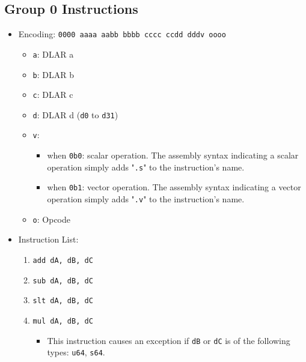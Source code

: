 \documentclass{article}
\begin{document}
	\subsection{Group 0 Instructions}
		\begin{itemize}
		\item Encoding: \texttt{0000 aaaa aabb bbbb  cccc ccdd dddv oooo}
			\begin{itemize}
			\item \texttt{a}: DLAR a
			\item \texttt{b}: DLAR b
			\item \texttt{c}: DLAR c
			\item \texttt{d}: DLAR d (\texttt{d0} to \texttt{d31})
			\item \texttt{v}:
				\begin{itemize}
				\item when \texttt{0b0}: scalar operation. The assembly
					syntax indicating a scalar operation simply adds
					"\texttt{.s}" to the instruction's name.
				\item when \texttt{0b1}: vector operation. The assembly
					syntax indicating a vector operation simply adds
					"\texttt{.v}" to the instruction's name.
				\end{itemize}
			\item \texttt{o}: Opcode
			\end{itemize}
		\item Instruction List:
			\begin{enumerate}
			\item \texttt{add dA, dB, dC}
			\item \texttt{sub dA, dB, dC}
			\item \texttt{slt dA, dB, dC}
			\item \texttt{mul dA, dB, dC}
				\begin{itemize}
				\item This instruction causes an exception if \texttt{dB}
					or \texttt{dC} is of the following types: \texttt{u64},
					\texttt{s64}.
				\end{itemize}


\end{enumerate}
\end{itemize}
\end{document}
